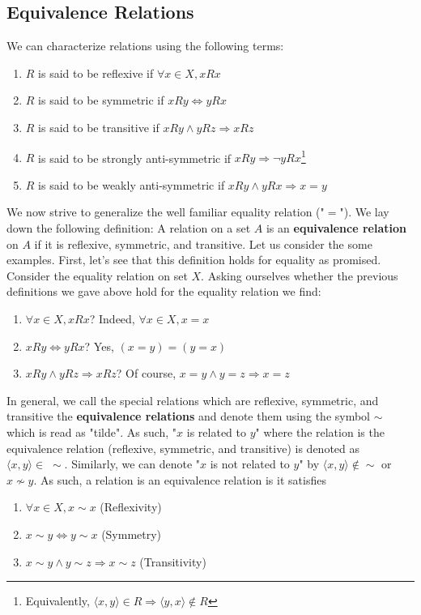 \documentclass{tufte-handout} %
\theoremstyle{definition}
\theoremstyle{remark}
\begin{document}
\subsection{Equivalence Relations}
\label{subsec:equivalence-relations}
We can characterize relations using the following terms:
\begin{enumerate}
 \item $R$ is said to be reflexive if $\forall x\in X, xRx$
 \item $R$ is said to be symmetric if $xRy \Longleftrightarrow yRx$
 \item $R$ is said to be transitive if $xRy \wedge yRz \Rightarrow xRz$ 
 \item $R$ is said to be strongly anti-symmetric if $xRy \Rightarrow \neg yRx$\footnote{Equivalently, $\langle x,y \rangle \in R \Rightarrow \langle y,x \rangle \not\in R$}
 \item $R$ is said to be weakly anti-symmetric if $xRy \land yRx \Rightarrow x=y$  
\end{enumerate}
We now strive to generalize the well familiar equality relation ("$=$"). We lay down the following definition:
A relation on a set $A$ is an \textbf{equivalence relation} on $A$ if it is reflexive, symmetric, and transitive. Let us consider the some examples. First, let's see that this definition holds for equality as promised. Consider the equality relation on set $X$. Asking ourselves whether the previous definitions we gave above hold for the equality relation we find:
\begin{enumerate}
\item $\forall x\in X, xRx$? Indeed, $\forall x\in X, x=x$
\item $xRy \Longleftrightarrow yRx$? Yes, $(x=y)=(y=x)$ 
\item $xRy \wedge yRz \Rightarrow xRz$? Of course, $x=y \land y=z \Rightarrow x=z$
\end{enumerate}
In general, we call the special relations which are reflexive, symmetric, and transitive the \textbf{equivalence relations} and denote them using the symbol $\sim$ which is read as "tilde". As such, "$x$ is related to $y$" where the relation is the equivalence relation (reflexive, symmetric, and transitive) is denoted as $\langle x,y \rangle \in \; \sim$. Similarly, we can denote "$x$ is not related to $y$" by $\langle x,y \rangle \not\in \sim$ or $x \not\sim y$. As such, a relation is an equivalence relation is it satisfies
\begin{enumerate}
 \item $\forall x\in X, x\sim x$ (Reflexivity)
 \item $x\sim y \Longleftrightarrow y\sim x$ (Symmetry)
 \item $x\sim y \wedge y\sim z \Rightarrow x\sim z$ (Transitivity)
\end{enumerate}
\end{document}
